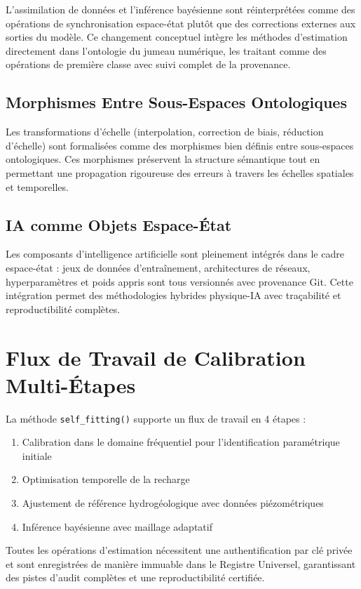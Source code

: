 L'assimilation de données et l'inférence bayésienne sont réinterprétées comme des opérations de synchronisation espace-état plutôt que des corrections externes aux sorties du modèle. Ce changement conceptuel intègre les méthodes d'estimation directement dans l'ontologie du jumeau numérique, les traitant comme des opérations de première classe avec suivi complet de la provenance.

\subsection*{Morphismes Entre Sous-Espaces Ontologiques}

Les transformations d'échelle (interpolation, correction de biais, réduction d'échelle) sont formalisées comme des morphismes bien définis entre sous-espaces ontologiques. Ces morphismes préservent la structure sémantique tout en permettant une propagation rigoureuse des erreurs à travers les échelles spatiales et temporelles.

\subsection*{IA comme Objets Espace-État}

Les composants d'intelligence artificielle sont pleinement intégrés dans le cadre espace-état : jeux de données d'entraînement, architectures de réseaux, hyperparamètres et poids appris sont tous versionnés avec provenance Git. Cette intégration permet des méthodologies hybrides physique-IA avec traçabilité et reproductibilité complètes.

\section*{Flux de Travail de Calibration Multi-Étapes}

La méthode \texttt{self\_fitting()} supporte un flux de travail en 4 étapes :
\begin{enumerate}
\item Calibration dans le domaine fréquentiel pour l'identification paramétrique initiale
\item Optimisation temporelle de la recharge
\item Ajustement de référence hydrogéologique avec données piézométriques
\item Inférence bayésienne avec maillage adaptatif
\end{enumerate}

Toutes les opérations d'estimation nécessitent une authentification par clé privée et sont enregistrées de manière immuable dans le Registre Universel, garantissant des pistes d'audit complètes et une reproductibilité certifiée.

